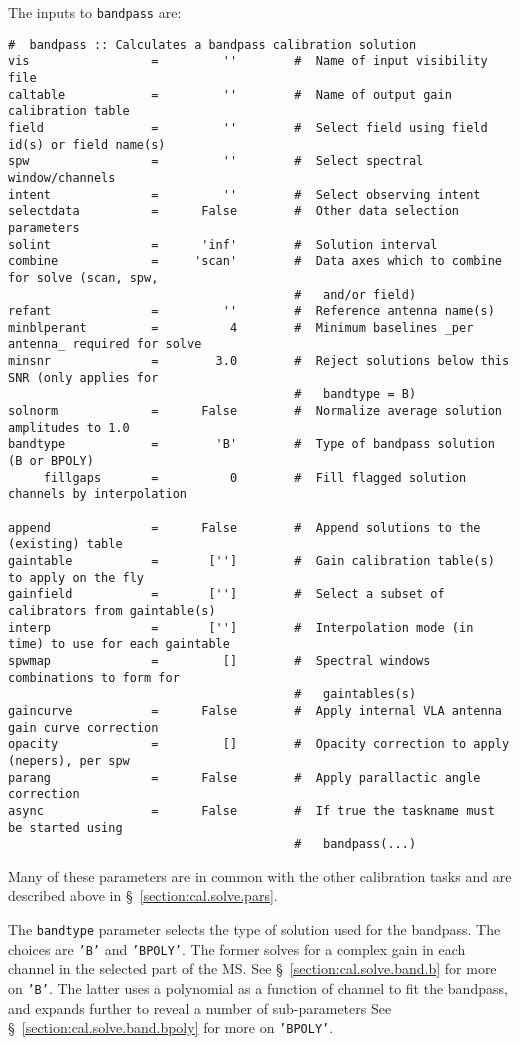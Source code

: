 The inputs to {\tt bandpass} are:
\small
\begin{verbatim}
#  bandpass :: Calculates a bandpass calibration solution
vis                 =         ''        #  Name of input visibility file
caltable            =         ''        #  Name of output gain calibration table
field               =         ''        #  Select field using field id(s) or field name(s)
spw                 =         ''        #  Select spectral window/channels
intent              =         ''        #  Select observing intent
selectdata          =      False        #  Other data selection parameters
solint              =      'inf'        #  Solution interval
combine             =     'scan'        #  Data axes which to combine for solve (scan, spw,
                                        #   and/or field)
refant              =         ''        #  Reference antenna name(s)
minblperant         =          4        #  Minimum baselines _per antenna_ required for solve
minsnr              =        3.0        #  Reject solutions below this SNR (only applies for
                                        #   bandtype = B)
solnorm             =      False        #  Normalize average solution amplitudes to 1.0
bandtype            =        'B'        #  Type of bandpass solution (B or BPOLY)
     fillgaps       =          0        #  Fill flagged solution channels by interpolation

append              =      False        #  Append solutions to the (existing) table
gaintable           =       ['']        #  Gain calibration table(s) to apply on the fly
gainfield           =       ['']        #  Select a subset of calibrators from gaintable(s)
interp              =       ['']        #  Interpolation mode (in time) to use for each gaintable
spwmap              =         []        #  Spectral windows combinations to form for
                                        #   gaintables(s)
gaincurve           =      False        #  Apply internal VLA antenna gain curve correction
opacity             =         []        #  Opacity correction to apply (nepers), per spw
parang              =      False        #  Apply parallactic angle correction
async               =      False        #  If true the taskname must be started using
                                        #   bandpass(...)
\end{verbatim}
\normalsize
Many of these parameters are in common with the other calibration
tasks and are described above in \S~\ref{section:cal.solve.pars}.

The {\tt bandtype} parameter selects the type of solution used for the
bandpass.  The choices are {\tt 'B'} and {\tt 'BPOLY'}.  The former 
solves for a complex gain in each channel in the selected part of the
MS. See \S~\ref{section:cal.solve.band.b} for more on {\tt 'B'}.
The latter uses a polynomial as a function of channel to fit the
bandpass, and expands further to reveal a number of sub-parameters
See \S~\ref{section:cal.solve.band.bpoly} for more on {\tt 'BPOLY'}.

